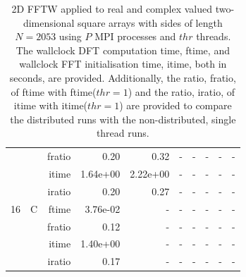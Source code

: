\documentclass[a4paper]{article}
\begin{document}
\begin{table}[htbp]
\begin{center}
\begin{small}
\begin{tabular}{|r|r|r|r|r|r|r|r|r|r|}
          &      & fratio & 0.20 & 0.32 &     -     &     -     &     -     &     -     &     -     \\   
          &      & itime & 1.64e+00 & 2.22e+00 &     -     &     -     &     -     &     -     &     -     \\   
          &      & iratio & 0.20 & 0.27 &     -     &     -     &     -     &     -     &     -     \\ \hline 
     16 & C & ftime & 3.76e-02 &     -     &     -     &     -     &     -     &     -     &     -     \\   
          &      & fratio & 0.12 &     -     &     -     &     -     &     -     &     -     &     -     \\   
          &      & itime & 1.40e+00 &     -     &     -     &     -     &     -     &     -     &     -     \\   
          &      & iratio & 0.17 &     -     &     -     &     -     &     -     &     -     &     -     \\ \hline 
\end{tabular}
\caption{2D FFTW applied to real and complex valued two-dimensional square arrays with sides of length $N=2053$ using $P$ MPI processes and $thr$ threads. The wallclock DFT computation time, ftime, and wallclock FFT initialisation time, itime, both in seconds, are provided. Additionally, the ratio, fratio, of ftime  with ftime($thr=1$) and the ratio, iratio, of itime  with itime($thr=1$) are provided to compare the distributed runs with the non-distributed, single thread runs.  }\label{TblFFTW2d2053}
\end{small}
\end{center}
\end{table}
\end{document}
